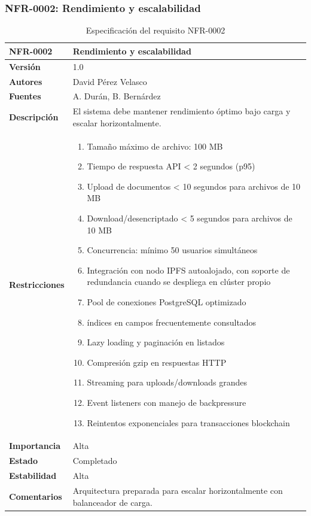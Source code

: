 \documentclass[11pt, a4paper]{article}
\begin{document}
\subsubsection{NFR-0002: Rendimiento y escalabilidad}

\begin{table}[H]
    \centering
    \small
    \begin{tabular}{|p{4cm}|p{10cm}|}
    \hline
    \textbf{NFR-0002} & Rendimiento y escalabilidad \\
    \hline
    \textbf{Versión} & 1.0 \\
    \hline
    \textbf{Autores} & David Pérez Velasco \\
    \hline
    \textbf{Fuentes} & A. Durán, B. Bernárdez \\
    \hline
    \textbf{Descripción} & El sistema debe mantener rendimiento óptimo bajo carga y escalar horizontalmente. \\
    \hline
    \textbf{Restricciones} & 
    \begin{enumerate}
        \item Tamaño máximo de archivo: 100 MB
        \item Tiempo de respuesta API < 2 segundos (p95)
        \item Upload de documentos < 10 segundos para archivos de 10 MB
        \item Download/desencriptado < 5 segundos para archivos de 10 MB
        \item Concurrencia: mínimo 50 usuarios simultáneos
        \item Integración con nodo IPFS autoalojado, con soporte de redundancia cuando se despliega en clúster propio
        \item Pool de conexiones PostgreSQL optimizado
        \item índices en campos frecuentemente consultados
        \item Lazy loading y paginación en listados
        \item Compresión gzip en respuestas HTTP
        \item Streaming para uploads/downloads grandes
        \item Event listeners con manejo de backpressure
        \item Reintentos exponenciales para transacciones blockchain
    \end{enumerate} \\
    \hline
    \textbf{Importancia} & Alta \\
    \hline
    \textbf{Estado} & Completado \\
    \hline
    \textbf{Estabilidad} & Alta \\
    \hline
    \textbf{Comentarios} & Arquitectura preparada para escalar horizontalmente con balanceador de carga. \\
    \hline
    \end{tabular}
    \caption{Especificación del requisito NFR-0002}
\end{table}
\end{document}
